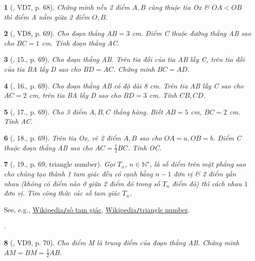 \documentclass{article}
\newtheorem{baitoan}{}
\begin{document}
\begin{baitoan}[\cite{Binh_Toan_6_tap_2}, VD7, p. 68]
	Chứng minh nếu 2 điểm $A,B$ cùng thuộc tia Ox \& $OA < OB$ thì điểm A nằm giữa 2 điểm $O,B$.
\end{baitoan}

\begin{baitoan}[\cite{Binh_Toan_6_tap_2}, VD8, p. 69]
	Cho đoạn thẳng $AB = 3$ {\rm cm}. Điểm C thuộc đường thẳng AB sao cho $BC = 1$ {\rm cm}. Tính  đoạn thẳng AC.
\end{baitoan}

\begin{baitoan}[\cite{Binh_Toan_6_tap_2}, 15., p. 69]
	Cho đoạn thẳng AB. Trên tia đối của tia AB lấy C, trên tia đối của tia BA lấy D sao cho $BD = AC$. Chứng minh $BC = AD$.
\end{baitoan}

\begin{baitoan}[\cite{Binh_Toan_6_tap_2}, 16., p. 69]
	Cho đoạn thẳng AB có độ dài {\rm8 cm}. Trên tia AB lấy C sao cho $AC = 2$ {\rm cm}, trên tia BA lấy D sao cho $BD = 3$ {\rm cm}. Tính  $CB,CD$.
\end{baitoan}

\begin{baitoan}[\cite{Binh_Toan_6_tap_2}, 17., p. 69]
	Cho 3 điểm $A,B,C$ thẳng hàng. Biết $AB = 5$ {\rm cm}, $BC = 2$ {\rm cm}. Tính  AC.
\end{baitoan}

\begin{baitoan}[\cite{Binh_Toan_6_tap_2}, 18., p. 69]
	Trên tia Ox, vẽ 2 điểm $A,B$ sao cho $OA = a,OB = b$. Điểm C thuộc đoạn thẳng AB sao cho $AC = \frac{1}{2}BC$. Tính  OC.
\end{baitoan}

\begin{baitoan}[\cite{Binh_Toan_6_tap_2}, 19., p. 69, triangle number]
	Gọi $T_n$, $n\in\mathbb{N}^\star$, là số điểm trên mặt phẳng sao cho chúng tạo thành 1 tam giác đều có cạnh bằng $n - 1$ đơn vị \& 2 điểm gần nhau (không có điểm nào ở giữa 2 điểm đó trong số $T_n$ điểm đó) thì cách nhau $1$ đơn vị. Tìm công thức các số tam giác $T_n$.
\end{baitoan}
See, e.g., \href{https://vi.wikipedia.org/wiki/S%E1%BB%91_tam_gi%C3%A1c}{Wikipedia{\tt/}số tam giác}, \href{https://en.wikipedia.org/wiki/Triangular_number}{Wikipedia{\tt/}triangle number}.

\noindent\cite[20., p. 70]{Binh_Toan_6_tap_2}.

\begin{baitoan}[\cite{Binh_Toan_6_tap_2}, VD9, p. 70]
	Cho điểm M là trung điểm của đoạn thẳng AB. Chứng minh $AM = BM = \frac{1}{2}AB$.
\end{baitoan}
\end{document}
